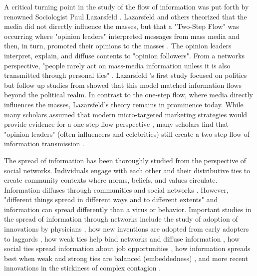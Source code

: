 A critical turning point in the study of the flow of information was put forth by
renowned Sociologist Paul Lazarsfeld \citeyearpar{lazarsfeldPeopleChoice1944}.
Lazarsfeld and others theorized that the media did not directly influence the
masses, but that a "Two-Step Flow" was occurring where "opinion leaders"
interpreted messages from mass media and then, in turn, promoted their opinions
to the masses \citep{katzPersonalInfluencePart1955}. The opinion leaders
interpret, explain, and diffuse contents to "opinion followers". From a networks
perspective, "people rarely act on mass-media information unless it is also
transmitted through personal ties" \citep[p. 1374]{granovetterStrengthWeakTies1973}. 
Lazarsfeld \citeyearpar{lazarsfeldPeopleChoice1944}'s first study focused on
politics but follow up studies from \citep{katzPersonalInfluencePart1955} showed
that this model matched information flows beyond the political realm. In
contrast to the one-step flow, where media directly influences the masses,
Lazarsfeld's theory remains in prominence today. While many scholars assumed
that modern micro-targeted marketing strategies would provide evidence for a
one-step flow perspective \citep{bennettOneStepFlowCommunication2006}, many
scholars find that "opinion leaders" (often influencers and celebrities) still
create a two-step flow of information transmission \citep{choi15,
hilbertOneStepTwo2017}.

The spread of information has been thoroughly studied from the perspective
of social networks. Individuals engage with each other and their distributive
ties to create community contexts where norms, beliefs, and values circulate.
Information diffuses through communities and social networks
\citep{fowler2010cooperative, bond_etal12, klarEffectNetworkStructure2017}.
However, "different things spread in different ways and to different extents"
\citep[p. 563]{christakisSocialContagionTheory2013} and information can spread
differently than a virus or behavior. Important studies in the spread of
information through networks include the study of adoption of innovations by
physicians \citep{colemanDiffusionInnovationPhysicians1957}, how new inventions
are adopted from early adopters to laggards
\citep{rogersDiffusionInnovations1962}, how weak ties help bind networks and
diffuse information \citep{granovetterStrengthWeakTies1973}, how social ties
spread information about job opportunities
\citep{granovetterGettingJobStudy1995, montgomeryJobSearchNetwork1992}, how
information spreads best when weak and strong ties are balanced (embeddedness)
\citep{uzziSocialStructureCompetition1997}, and more recent innovations in the
stickiness of complex contagion \citep{centolaComplexContagionsWeakness2007}.

